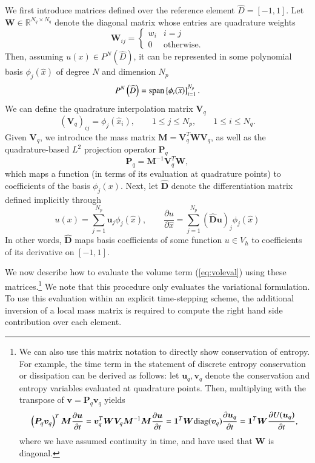 \documentclass[preprint,10pt]{elsarticle}
\theoremstyle{definition}
\theoremstyle{lemma}
\theoremstyle{theorem}
\theoremstyle{assumption}
\newcommand{\pd}[2]{\frac{\partial#1}{\partial#2}}
\newcommand{\LRp}[1]{\left( #1 \right)}
\newcommand{\LRc}[1]{\left\{ #1 \right\}}
\begin{document}
We first introduce matrices defined over the reference element $\widehat{D} = [-1,1]$.  Let $\bm{W} \in \mathbb{R}^{N_q\times N_q}$ denote the diagonal matrix whose entries are quadrature weights
\[
\bm{W}_{ij} = \begin{cases}
w_i & i=j\\
0 & \text{otherwise}.
\end{cases}
\]
Then, assuming $u(x) \in P^N\LRp{\widehat{D}}$, it can be represented in some polynomial basis $\phi_j(\widehat{x})$ of degree $N$ and dimension $N_p$ 
\[
P^N\LRp{\widehat{D}} = {\rm span}\LRc{\phi_i(\widehat{x})}_{i=1}^{N_p}.
\]
We can define the quadrature interpolation matrix $\bm{V}_q$
\[
\LRp{\bm{V}_q}_{ij} = \phi_j(\widehat{x}_i), \qquad 1 \leq j \leq N_p, \qquad 1 \leq i \leq N_q.  
\]
Given $\bm{V}_q$, we introduce the mass matrix $\bm{M} = \bm{V}_q^T\bm{W}\bm{V}_q$, as well as the quadrature-based $L^2$ projection operator $\bm{P}_q$
\[
\bm{P}_q = \bm{M}^{-1}\bm{V}_q^T\bm{W},
\]
which maps a function (in terms of its evaluation at quadrature points) to coefficients of the basis $\phi_j(x)$.  Next, let $\widehat{\bm{D}}$ denote the differentiation matrix defined implicitly through
\[
u(x) = \sum_{j=1}^{N_p} \bm{u}_j \phi_j(\widehat{x}), \qquad \pd{u}{\widehat{x}} = \sum_{j=1}^{N_p} \LRp{\widehat{\bm{D}} \bm{u}}_j\phi_j(\widehat{x})
\]
In other words, $\widehat{\bm{D}}$ maps basis coefficients of some function $u \in V_h$ to coefficients of its derivative on $[-1,1]$.  

We now describe how to evaluate the volume term (\ref{eq:voleval}) using these matrices.\footnote{We can also use this matrix notation to directly show conservation of entropy.  For example, the time term in the statement of discrete entropy conservation or dissipation can be derived as follows: let $\bm{u}_q, \bm{v}_q$ denote the conservation and entropy variables evaluated at quadrature points.  Then, multiplying with the transpose of $\bm{v} = {\bm{P}_q\bm{v}_q}$ yields
\[
\LRp{\bm{P}_q\bm{v}_q}^T\bm{M}\pd{\bm{u}}{t} = \bm{v}_q^T\bm{W}\bm{V}_q\bm{M}^{-1}\bm{M}\pd{\bm{u}}{t} = \bm{1}^T \bm{W} {\rm diag}(\bm{v}_q) \pd{\bm{u}_q}{t} = \bm{1}^T \bm{W} \pd{U(\bm{u}_q)}{t},
\]
where we have assumed continuity in time, and have used that $\bm{W}$ is diagonal.  }  We note that this procedure only evaluates the variational formulation.  To use this evaluation within an explicit time-stepping scheme, the additional inversion of a local mass matrix is required to compute the right hand side contribution over each element.  
\end{document}
